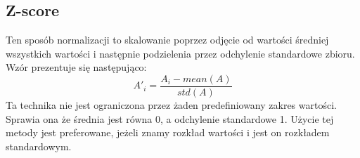         \subsection{Z-score}
            Ten sposób normalizacji to skalowanie poprzez odjęcie od wartości średniej wszystkich wartości i następnie podzielenia przez odchylenie standardowe zbioru. Wzór prezentuje się następująco:
            \begin{equation}
            \label{eqn:minmax}
            A'_i = \frac{A_i-mean(A)}{std(A)}
            \end{equation}
            Ta technika nie jest ograniczona przez żaden predefiniowany zakres wartości. Sprawia ona że średnia jest równa 0, a odchylenie standardowe 1. Użycie tej metody jest preferowane, jeżeli znamy rozkład wartości i jest on rozkładem standardowym.
